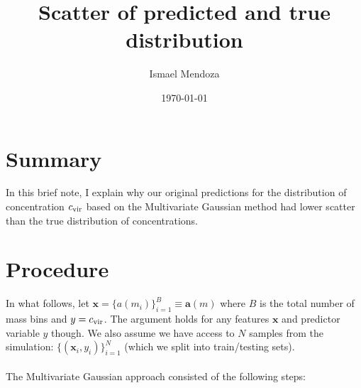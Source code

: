 \documentclass[a4paper]{article}
\title{Scatter of predicted and true distribution}
\author{Ismael Mendoza}
\date{\today}
\newcommand{\cvir}[0]{c_{\rm vir}}
\renewcommand{\vec}[1]{\boldsymbol{#1}}
\newcommand{\xv}[0]{\vec{x}}
\begin{document}
\maketitle


\section{Summary}

In this brief note, I explain why our original predictions for the distribution of concentration $c_{\rm vir}$ based on the Multivariate Gaussian method had lower scatter than the true distribution of concentrations. 

\section{Procedure}

In what follows, let $\xv = \{a(m_{i})\}_{i=1}^{B} \equiv \vec{a}(m)$ where $B$ is the total number of mass bins and $y = \cvir$. The argument holds for any features $\vec{x}$ and predictor variable $y$ though. We also assume we have access to $N$ samples from the simulation: $\{\left(\vec{x}_{i}, y_{i}\right)\}_{i=1}^{N}$ (which we split into train/testing sets). 
\\ \\
The Multivariate Gaussian approach consisted of the following steps: 
\end{document}
